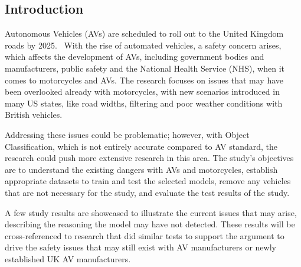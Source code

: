 \documentclass[a0,portrait]{a0poster}
\begin{document}
\begin{multicols}{2} %


	\color{ku} %

	\begin{abstract}

	\end{abstract}


	\color{DarkRed} %

    \section*{Introduction}
        Autonomous Vehicles (AVs) are scheduled to roll out to the United Kingdom roads by 2025.~\cite{govuk_self-driving_2022} With the rise of automated vehicles, a safety concern arises, which affects the development of AVs, including government bodies and manufacturers, public safety and the National Health Service (NHS), when it comes to motorcycles and AVs. The research focuses on issues that may have been overlooked already with motorcycles, with new scenarios introduced in many US states, like road widths, filtering and poor weather conditions with British vehicles. 

        Addressing these issues could be problematic; however, with Object Classification, which is not entirely accurate compared to AV standard, the research could push more extensive research in this area. The study's objectives are to understand the existing dangers with AVs and motorcycles, establish appropriate datasets to train and test the selected models, remove any vehicles that are not necessary for the study, and evaluate the test results of the study.
        
        A few study results are showcased to illustrate the current issues that may arise, describing the reasoning the model may have not detected. These results will be cross-referenced to research that did similar tests to support the argument to drive the safety issues that may still exist with AV manufacturers or newly established UK AV manufacturers.
	

\end{multicols}
\end{document}

